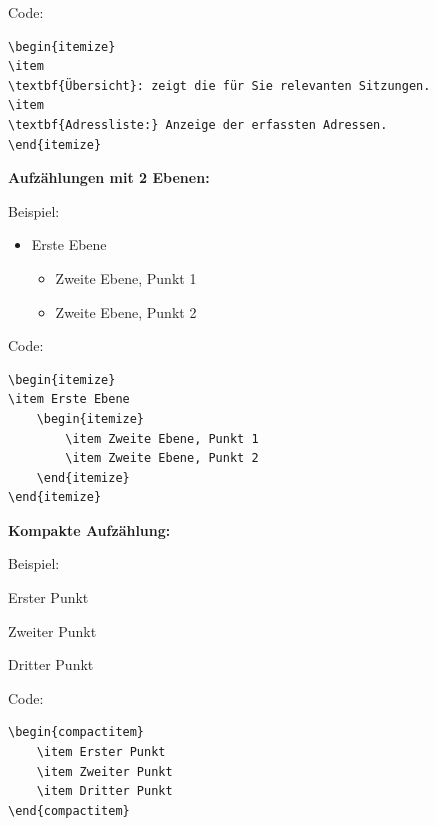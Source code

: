 \vspace{\baselineskip}

Code:
\begin{verbatim}
\begin{itemize}
\item
\textbf{Übersicht}: zeigt die für Sie relevanten Sitzungen.
\item
\textbf{Adressliste:} Anzeige der erfassten Adressen.
\end{itemize}
\end{verbatim}

\textbf{Aufzählungen mit 2 Ebenen:}

Beispiel:
\begin{itemize}
\item Erste Ebene
	\begin{itemize}
		\item Zweite Ebene, Punkt 1
		\item Zweite Ebene, Punkt 2
	\end{itemize}
\end{itemize}

Code:

\begin{verbatim}
\begin{itemize}
\item Erste Ebene
	\begin{itemize}
		\item Zweite Ebene, Punkt 1
		\item Zweite Ebene, Punkt 2
	\end{itemize}
\end{itemize}
\end{verbatim}

\textbf{Kompakte Aufzählung:}

Beispiel:\\
\begin{compactitem}
	\item Erster Punkt
	\item Zweiter Punkt
	\item Dritter Punkt
\end{compactitem}

\vspace{\baselineskip}

Code:

\begin{verbatim}
\begin{compactitem}
	\item Erster Punkt
	\item Zweiter Punkt
	\item Dritter Punkt
\end{compactitem}
\end{verbatim}

